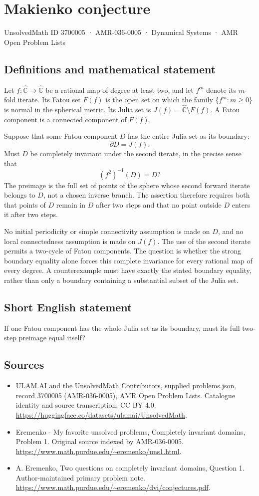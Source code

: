 \documentclass[11pt,a4paper]{article}
\begin{document}
\section*{Makienko conjecture}\label{3700005}
{\small UnsolvedMath ID 3700005 · AMR-036-0005 · Dynamical Systems · AMR Open Problem Lists}
\subsection{Definitions and mathematical statement}
Let $f:\widehat{\mathbb C}\to\widehat{\mathbb C}$ be a rational
map of degree at least two, and let $f^m$ denote its $m$-fold
iterate. Its Fatou set $F(f)$ is the open set on which the
family $\{f^m:m\geq0\}$ is normal in the spherical metric.
Its Julia set is $J(f)=\widehat{\mathbb C}\setminus F(f)$.
A Fatou component is a connected component of $F(f)$.

Suppose that some Fatou component $D$ has the entire Julia
set as its boundary:
\[
                    \partial D=J(f).
\]
Must $D$ be completely invariant under the second iterate,
in the precise sense that
\[
 (f^2)^{-1}(D)=D?
\]
The preimage is the full set of points of the sphere whose
second forward iterate belongs to $D$, not a chosen inverse
branch. The assertion therefore requires both that points
of $D$ remain in $D$ after two steps and that no point
outside $D$ enters it after two steps.

No initial periodicity or simple connectivity assumption is
made on $D$, and no local connectedness assumption is made
on $J(f)$. The use of the second iterate permits a two-cycle
of Fatou components. The question is whether the strong
boundary equality alone forces this complete invariance for
every rational map of every degree. A counterexample must
have exactly the stated boundary equality, rather than only
a boundary containing a substantial subset of the Julia set.
\subsection{Short English statement}
If one Fatou component has the whole Julia set as its boundary, must its full two-step preimage equal itself?
\subsection{Sources}
\begin{itemize}
\item[S1] ULAM.AI and the UnsolvedMath Contributors, supplied problems.json, record 3700005 (AMR-036-0005), AMR Open Problem Lists. Catalogue identity and source transcription; CC BY 4.0.
\url{https://huggingface.co/datasets/ulamai/UnsolvedMath}.
\item[S2] Eremenko - My favorite unsolved problems, Completely invariant domains, Problem 1. Original source indexed by AMR-036-0005.
\url{https://www.math.purdue.edu/~eremenko/uns1.html}.
\item[S3] A. Eremenko, Two questions on completely invariant domains, Question 1. Author-maintained primary problem note.
\url{https://www.math.purdue.edu/~eremenko/dvi/conjectures.pdf}.
\end{itemize}
\end{document}
